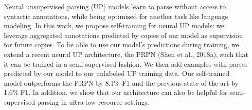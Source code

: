 Neural unsupervised parsing (UP) models learn to parse without access to syntactic annotations, while being optimized for another task like language modeling. In this work, we propose self-training for neural  UP models: we leverage aggregated annotations predicted by copies of our model as supervision for future copies. To be able to use our model's predictions during training, we extend a recent neural UP architecture, the PRPN (Shen et al., 2018a), such that it can be trained in a semi-supervised fashion. We then add examples with parses predicted by our model to our unlabeled UP training data. Our self-trained model outperforms the PRPN by 8.1\% F1 and the previous state of the art by 1.6\% F1. In addition, we show that our architecture can also be helpful for semi-supervised parsing in ultra-low-resource settings.
